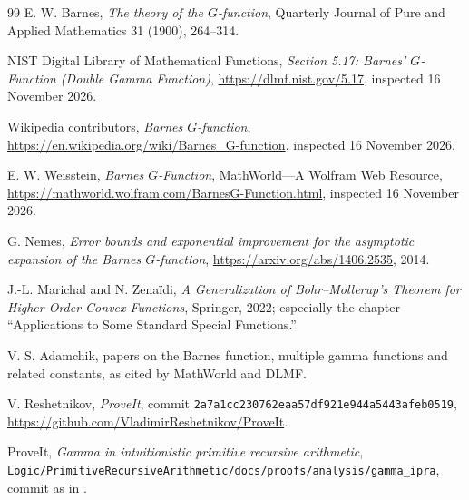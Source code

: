 \documentclass[11pt]{article}
\newcommand{\code}[1]{\texttt{#1}}
\begin{document}
\begin{thebibliography}{99}
E. W. Barnes, \emph{The theory of the $G$-function}, Quarterly Journal of Pure and Applied Mathematics 31 (1900), 264--314.

NIST Digital Library of Mathematical Functions, \emph{Section 5.17: Barnes' $G$-Function (Double Gamma Function)},
\url{https://dlmf.nist.gov/5.17}, inspected 16 November 2026.

Wikipedia contributors, \emph{Barnes $G$-function},
\url{https://en.wikipedia.org/wiki/Barnes_G-function}, inspected 16 November 2026.

E. W. Weisstein, \emph{Barnes $G$-Function}, MathWorld---A Wolfram Web Resource,
\url{https://mathworld.wolfram.com/BarnesG-Function.html}, inspected 16 November 2026.

G. Nemes, \emph{Error bounds and exponential improvement for the asymptotic expansion of the Barnes $G$-function},
\url{https://arxiv.org/abs/1406.2535}, 2014.

J.-L. Marichal and N. Zena\"idi, \emph{A Generalization of Bohr--Mollerup's Theorem for Higher Order Convex Functions}, Springer, 2022; especially the chapter ``Applications to Some Standard Special Functions.''

V. S. Adamchik, papers on the Barnes function, multiple gamma functions and related constants, as cited by MathWorld and DLMF.

V. Reshetnikov, \emph{ProveIt}, commit
\code{2a7a1cc230762eaa57df921e944a5443afeb0519},
\url{https://github.com/VladimirReshetnikov/ProveIt}.

ProveIt, \emph{Gamma in intuitionistic primitive recursive arithmetic},
\code{Logic/PrimitiveRecursiveArithmetic/docs/proofs/analysis/gamma\_ipra},
commit as in \cite{ProveIt}.
\end{thebibliography}
\end{document}
